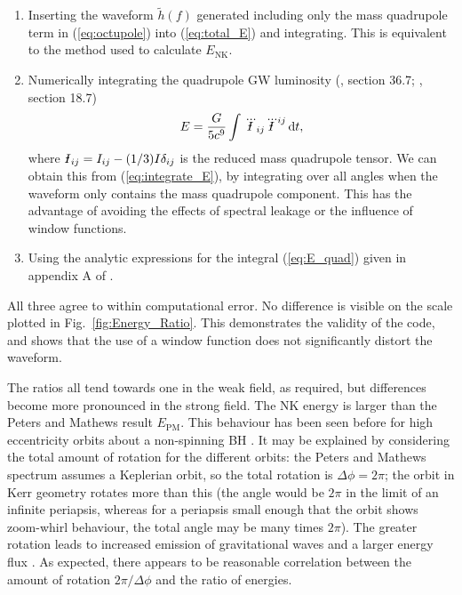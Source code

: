 \documentclass[useAMS,usedcolumn,usegraphicx,usenatbib]{mn2e}
\newcommand{\eqnref}[1]{(\ref{eq:#1})}
\newcommand{\figref}[1]{Fig.~\ref{fig:#1}}
\newcommand{\sub}[1]{\ensuremath{_\mathrm{#1}}}
\newcommand{\dd}{\ensuremath{\mathrm{d}}}
\newcommand{\intd}[4]{\ensuremath{\int_{#1}^{#2}{#3}\,\dd{#4}}}
\newcommand{\Ibar}{{\declareslashed{}{\text{-}}{0.04}{-0.2}{I}\slashed{I}}}
\begin{document}
\begin{enumerate}
\item Inserting the waveform $\widetilde{h}(f)$ generated including only the mass quadrupole term in \eqnref{octupole} into \eqnref{total_E} and integrating. This is equivalent to the method used to calculate $E\sub{NK}$.
\item Numerically integrating the quadrupole GW luminosity (\citealt{Misner1973}, section 36.7; \citealt{Hobson2006}, section 18.7)
\begin{equation}
E = \frac{G}{5c^9}\intd{}{}{\dddot{\Ibar}_{ij}\dddot{\Ibar}^{ij}}{t},
\label{eq:E_quad}
\end{equation}
where $\Ibar_{ij} = I_{ij} - (1/3)I\delta_{ij}$ is the reduced mass quadrupole tensor. We can obtain this from \eqnref{integrate_E}, by integrating over all angles when the waveform only contains the mass quadrupole component. This has the advantage of avoiding the effects of spectral leakage or the influence of window functions.
\item Using the analytic expressions for the integral \eqnref{E_quad} given in appendix A of \citet{Gair2005}.
\end{enumerate}
All three agree to within computational error. No difference is visible on the scale plotted in \figref{Energy_Ratio}. This demonstrates the validity of the code, and shows that the use of a window function does not significantly distort the waveform.

The ratios all tend towards one in the weak field, as required, but differences become more pronounced in the strong field. The NK energy is larger than the Peters and Mathews result $E\sub{PM}$. This behaviour has been seen before for high eccentricity orbits about a non-spinning BH \citep{Gair2005}. It may be explained by considering the total amount of rotation for the different orbits: the Peters and Mathews spectrum assumes a Keplerian orbit, so the total rotation is $\Delta\phi = 2\pi$; the orbit in Kerr geometry rotates more than this (the angle would be $2\pi$ in the limit of an infinite periapsis, whereas for a periapsis small enough that the orbit shows zoom-whirl behaviour, the total angle may be many times $2\pi$). The greater rotation leads to increased emission of gravitational waves and a larger energy flux \citep{Berry2010}. As expected, there appears to be reasonable correlation between the amount of rotation $2\pi/\Delta\phi$ and the ratio of energies.
\end{document}
